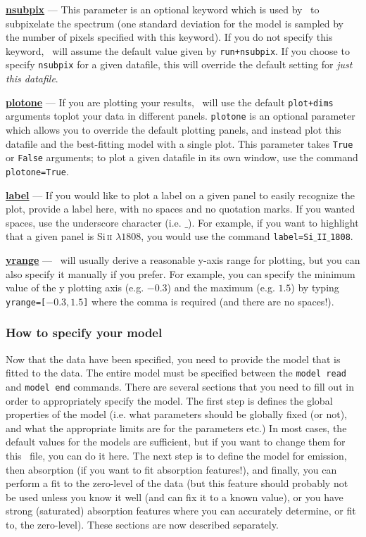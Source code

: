 \textbf{\underline{nsubpix}} --- This parameter is an optional keyword which is used by
     \alis\ to subpixelate the spectrum (one standard deviation for the model is sampled
     by the number of pixels specified with this keyword). If you do not specify this keyword,
     \alis\ will assume the default value given by \texttt{run+nsubpix}. If you choose to specify
     \texttt{nsubpix} for a given datafile, this will override the default setting for \textit{just this datafile}.

\textbf{\underline{plotone}} --- If you are plotting your results, \alis\ will use the default \texttt{plot+dims}
     arguments toplot your data in different panels. \texttt{plotone} is an optional parameter which allows
     you to override the default plotting panels, and instead plot this datafile and the best-fitting model
     with a single plot. This parameter takes \texttt{True} or \texttt{False} arguments; to plot a given datafile
     in its own window, use the command \texttt{plotone=True}.

\textbf{\underline{label}} --- If you would like to plot a label on a given panel to easily recognize the plot,
     provide a label here, with no spaces and no quotation marks. If you wanted spaces, use the underscore
     character (i.e. $\_$). For example, if you want to highlight that a given panel is Si\,\textsc{ii} $\lambda1808$,
     you would use the command \texttt{label=Si$\_$II$\_$1808}.

\textbf{\underline{yrange}} --- \alis\ will usually derive a reasonable y-axis range for plotting, but you
     can also specify it manually if you prefer. For example, you can specify the minimum value of the
     y plotting axis (e.g. $-0.3$) and the maximum (e.g. $1.5$) by typing \texttt{yrange=[$-0.3,1.5$]} where
     the comma is required (and there are no spaces!).


\subsubsection{How to specify your model}
\label{sec:specifymodel}

Now that the data have been specified, you need to provide the model
that is fitted to the data. The entire model must be specified between the
\texttt{model read} and \texttt{model end} commands. There are several
sections that you need to fill out in order to appropriately specify the model.
The first step is defines the global properties of the model (i.e. what parameters
should be globally fixed (or not), and what the appropriate limits are for the
parameters etc.) In most cases, the default values for the models are sufficient,
but if you want to change them for this \dmod\ file, you can do it here. The next
step is to define the model for emission, then absorption (if you want to fit
absorption features!), and finally, you can perform a fit to the zero-level of the
data (but this feature should probably not be used unless you know
it well (and can fix it to a known value), or you have strong (saturated) absorption
features where you can accurately determine, or fit to, the zero-level). These
sections are now described separately.


